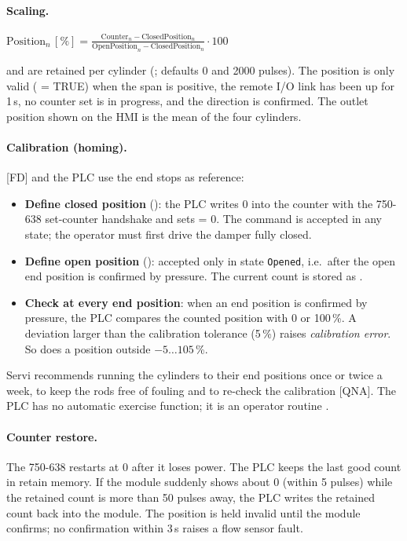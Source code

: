 \documentclass[11pt,a4paper]{article}
\begin{document}
\paragraph{Scaling.}
\begin{center}
$\displaystyle
  \text{Position}_n\,[\%] = \frac{\text{Counter}_n - \text{ClosedPosition}_n}
        {\text{OpenPosition}_n - \text{ClosedPosition}_n}\cdot 100$
\end{center}
 and  are retained per cylinder (;
defaults 0 and 2000 pulses). The position is only valid ( = TRUE) when the span is
positive, the remote I/O link has been up for 1\,s, no counter set is in progress, and the
direction is confirmed. The outlet position shown on the HMI is the mean of the four cylinders.

\paragraph{Calibration (homing).} [FD] and the PLC use the end stops as reference:
\begin{itemize}[nosep]
  \item \textbf{Define closed position} (): the PLC writes 0 into the
        counter with the 750-638 set-counter handshake and sets  = 0. The
        command is accepted in any state; the operator must first drive the damper fully closed.
  \item \textbf{Define open position} (): accepted only in state
        \texttt{Opened}, i.e.\ after the open end position is confirmed by pressure. The current
        count is stored as .
  \item \textbf{Check at every end position}: when an end position is confirmed by pressure, the
        PLC compares the counted position with 0 or 100\,\%. A deviation larger than the
        calibration tolerance (5\,\%) raises \emph{calibration error}. So does a position outside
        $-5\ldots105$\,\%.
\end{itemize}
Servi recommends running the cylinders to their end positions once or twice a week, to keep the
rods free of fouling and to re-check the calibration [QNA]. The PLC has no automatic exercise
function; it is an operator routine .

\paragraph{Counter restore.} The 750-638 restarts at 0 after it loses power. The PLC keeps the last
good count in retain memory. If the module suddenly shows about 0 (within 5 pulses) while the
retained count is more than 50 pulses away, the PLC writes the retained count back into the module.
The position is held invalid until the module confirms; no confirmation within 3\,s raises a flow
sensor fault.
\end{document}
